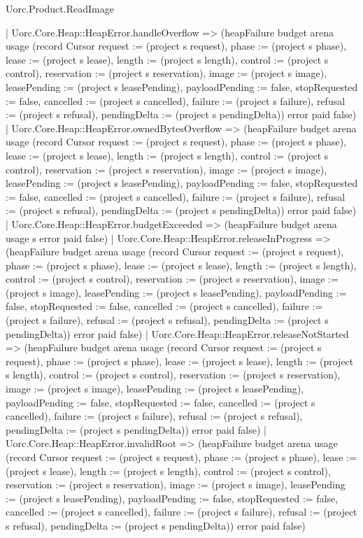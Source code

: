 \begin{lexlean}{Uorc.Product.ReadImage}
\begin{semanticmodule}
{    | Uorc.Core.Heap::HeapError.handleOverflow => (heapFailure budget arena usage (record Cursor {request := (project s request), phase := (project s phase), lease := (project s lease), length := (project s length), control := (project s control), reservation := (project s reservation), image := (project s image), leasePending := (project s leasePending), payloadPending := false, stopRequested := false, cancelled := (project s cancelled), failure := (project s failure), refusal := (project s refusal), pendingDelta := (project s pendingDelta)}) error paid false)
    | Uorc.Core.Heap::HeapError.ownedBytesOverflow => (heapFailure budget arena usage (record Cursor {request := (project s request), phase := (project s phase), lease := (project s lease), length := (project s length), control := (project s control), reservation := (project s reservation), image := (project s image), leasePending := (project s leasePending), payloadPending := false, stopRequested := false, cancelled := (project s cancelled), failure := (project s failure), refusal := (project s refusal), pendingDelta := (project s pendingDelta)}) error paid false)
    | Uorc.Core.Heap::HeapError.budgetExceeded => (heapFailure budget arena usage s error paid false)
    | Uorc.Core.Heap::HeapError.releaseInProgress => (heapFailure budget arena usage (record Cursor {request := (project s request), phase := (project s phase), lease := (project s lease), length := (project s length), control := (project s control), reservation := (project s reservation), image := (project s image), leasePending := (project s leasePending), payloadPending := false, stopRequested := false, cancelled := (project s cancelled), failure := (project s failure), refusal := (project s refusal), pendingDelta := (project s pendingDelta)}) error paid false)
    | Uorc.Core.Heap::HeapError.releaseNotStarted => (heapFailure budget arena usage (record Cursor {request := (project s request), phase := (project s phase), lease := (project s lease), length := (project s length), control := (project s control), reservation := (project s reservation), image := (project s image), leasePending := (project s leasePending), payloadPending := false, stopRequested := false, cancelled := (project s cancelled), failure := (project s failure), refusal := (project s refusal), pendingDelta := (project s pendingDelta)}) error paid false)
    | Uorc.Core.Heap::HeapError.invalidRoot => (heapFailure budget arena usage (record Cursor {request := (project s request), phase := (project s phase), lease := (project s lease), length := (project s length), control := (project s control), reservation := (project s reservation), image := (project s image), leasePending := (project s leasePending), payloadPending := false, stopRequested := false, cancelled := (project s cancelled), failure := (project s failure), refusal := (project s refusal), pendingDelta := (project s pendingDelta)}) error paid false)
}
\end{semanticmodule}
\end{lexlean}

